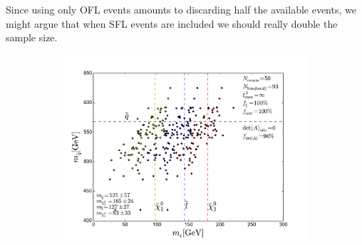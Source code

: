\documentclass[twoside,english]{uiofysmaster}
\begin{document}
Since using only OFL events amounts to discarding half the available events, we might argue that when SFL events are included we should really double the sample size.
\begin{figure}[hbt]
	\centering
	\begin{subfigure}[b]{0.6\textwidth}
		\includegraphics[width=\textwidth]{figures/improving_combinatorics/herwigpp-OSFL-50events_nosmear_nodetAcut_A_matrix_algorithm_4combosum_TMP.pdf} 
		\caption{ }
		\label{fig:event-pair-A-selection_4combosum-OSFL-50events_a}
	\end{subfigure}


\end{figure}
\end{document}
